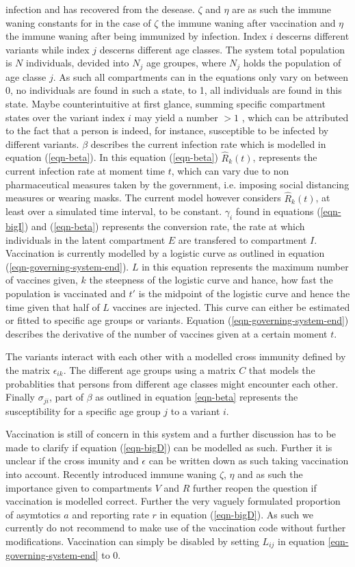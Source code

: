 \documentclass[a4paper,12pt]{article}
\begin{document}
infection and has recovered from the desease. $\zeta$ and $\eta$ are
as such the immune waning constants for in the case of $\zeta$ the
immune waning after vaccination and $\eta$ the immune waning after
being immunized by infection. Index $i$ descerns different variants
while index $j$ descerns different age classes.
The system total population is $N$
individuals, devided into $N_j$ age groupes, where $N_j$ holds the
population of age classe $j$. As such all compartments can in the
equations only vary on between 0, no individuals are found in such a
state, to 1, all individuals are found in this state. Maybe
counterintuitive at first glance, summing specific compartment
states over the variant index $i$ may yield a number  $>1$ , which
can be attributed to the fact that a person is indeed, for instance,
susceptible to be infected by different variants. $\beta$ describes
the current infection rate which is modelled in equation
(\ref{eqn-beta}). In this equation (\ref{eqn-beta}) $\hat{R}_k(t)$, represents
the current infection rate at moment time $t$, which can vary due to
non pharmaceutical measures taken by the government, i.e. imposing
social distancing measures or wearing masks. The current model however
considers $\hat{R}_k(t)$, at least over a simulated time
interval, to be constant. $\gamma_i$ found in equations
(\ref{eqn-bigI}) and (\ref{eqn-beta}) represents the conversion rate,
the rate at which individuals in the latent compartment $E$ are
transfered to compartment $I$. Vaccination is currently modelled by a
logistic curve as outlined in equation
(\ref{eqn-governing-system-end}). $L$ in this equation represents the
maximum number of vaccines given, $k$ the steepness of the logistic
curve and hance, how fast the population is vaccinated and $t'$ is the
midpoint of the logistic curve and hence the time given that half of
$L$ vaccines are injected. This curve can either be estimated or
fitted to specific age groups or variants. Equation
(\ref{eqn-governing-system-end}) describes the derivative of the number of
vaccines given at a certain moment $t$. 

The variants interact with each other with a modelled cross immunity
defined by the matrix $\epsilon_{ik}$. The different age groups using
a matrix $C$ that models the probablities that persons from different
age classes might encounter each other. Finally $\sigma_{ji}$, part of
$\beta$ as outlined in equation \ref{eqn-beta} represents the
susceptibility for a specific age group $j$ to a variant $i$.

Vaccination is still of concern in this system and a further
discussion has to be made to clarify if equation (\ref{eqn-bigD}) can
be modelled as such. Further it is unclear if the cross imunity and
$\epsilon$ can be written down as such taking vaccination into
account. Recently introduced immune waning $\zeta$, $\eta$ and as such
the importance given to compartments $V$ and $R$ further reopen the
question if vaccination is modelled correct. Further the very vaguely
formulated proportion of asymtotics $a$ and reporting rate $r$ in
equation (\ref{eqn-bigD}). As such we currently do not recommend to
make use of the vaccination code without further modifications. Vaccination
can simply be disabled by setting $L_{ij}$ in equation
\ref{eqn-governing-system-end} to 0. 
\end{document}
